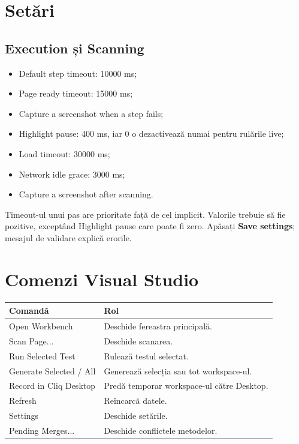 \documentclass[12pt,a4paper]{report}
\newcommand{\UI}[1]{\textbf{#1}}
\begin{document}
\chapter{Setări}

\section{Execution și Scanning}

\begin{itemize}
  \item Default step timeout: 10000 ms;
  \item Page ready timeout: 15000 ms;
  \item Capture a screenshot when a step fails;
  \item Highlight pause: 400 ms, iar 0 o dezactivează numai pentru rulările live;
  \item Load timeout: 30000 ms;
  \item Network idle grace: 3000 ms;
  \item Capture a screenshot after scanning.
\end{itemize}

Timeout-ul unui pas are prioritate față de cel implicit. Valorile trebuie să fie pozitive, exceptând Highlight pause care poate fi zero. Apăsați \UI{Save settings}; mesajul de validare explică erorile.

\chapter{Comenzi Visual Studio}

\begin{tabularx}{\textwidth}{@{}p{4cm}Y@{}}
\toprule \textbf{Comandă} & \textbf{Rol} \\
\midrule
Open Workbench & Deschide fereastra principală. \\
Scan Page... & Deschide scanarea. \\
Run Selected Test & Rulează testul selectat. \\
Generate Selected / All & Generează selecția sau tot workspace-ul. \\
Record in Cliq Desktop & Predă temporar workspace-ul către Desktop. \\
Refresh & Reîncarcă datele. \\
Settings & Deschide setările. \\
Pending Merges... & Deschide conflictele metodelor. \\
\bottomrule
\end{tabularx}
\end{document}
